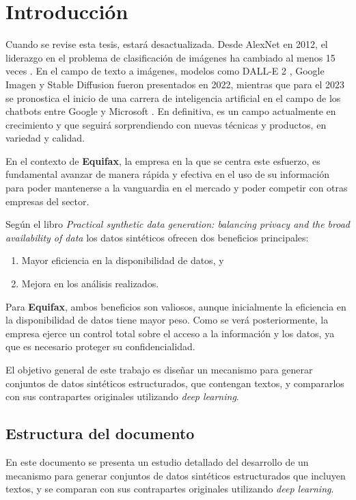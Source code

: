 \chapter{Introducción}
Cuando se revise esta tesis, estará desactualizada. Desde AlexNet \cite{krizhevsky_imagenet_2012} en 2012, el liderazgo en el problema de clasificación de imágenes ha cambiado al menos 15 veces \cite{noauthor_papers_nodate}. En el campo de texto a imágenes, modelos como DALL-E 2 \cite{noauthor_dalle_nodate}, Google Imagen \cite{noauthor_imagen_nodate} y Stable Diffusion \cite{noauthor_stable_nodate} fueron presentados en 2022, mientras que para el 2023 se pronostica el inicio de una carrera de inteligencia artificial en el campo de los chatbots entre Google y Microsoft \cite{milmo_google_2023, noauthor_microsoft_2023}. En definitiva, es un campo actualmente en crecimiento y que seguirá sorprendiendo con nuevas técnicas y productos, en variedad y calidad.

En el contexto de \textbf{Equifax}, la empresa en la que se centra este esfuerzo, es fundamental avanzar de manera rápida y efectiva en el uso de su información para poder mantenerse a la vanguardia en el mercado y poder competir con otras empresas del sector.

Según el libro \emph{Practical synthetic data generation: balancing privacy and the broad availability of data} \cite{el_emam_practical_2020} los datos sintéticos ofrecen dos beneficios principales:
\begin{enumerate}
    \item Mayor eficiencia en la disponibilidad de datos, y
    \item Mejora en los análisis realizados.
\end{enumerate}

Para \textbf{Equifax}, ambos beneficios son valiosos, aunque inicialmente la eficiencia en la disponibilidad de datos tiene mayor peso. Como se verá posteriormente, la empresa ejerce un control total sobre el acceso a la información y los datos, ya que es necesario proteger su confidencialidad.

El objetivo general de este trabajo es diseñar un mecanismo para generar conjuntos de datos sintéticos estructurados, que contengan textos, y compararlos con sus contrapartes originales utilizando \emph{deep learning}.

\section{Estructura del documento}
En este documento se presenta un estudio detallado del desarrollo de un mecanismo para generar conjuntos de datos sintéticos estructurados que incluyen textos, y se comparan con sus contrapartes originales utilizando \emph{deep learning}.

